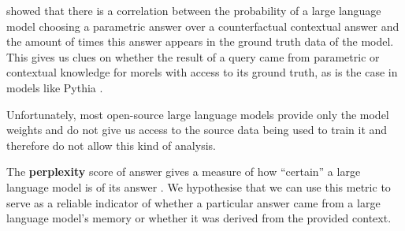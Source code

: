  showed that there is a correlation between the probability of a large language model choosing a parametric answer over a counterfactual contextual answer and the amount of times this answer appears in the ground truth data of the model.
This gives us clues on whether the result of a query came from parametric or contextual knowledge for morels with access to its ground truth, as is the case in models like Pythia \citep{pythia}.

Unfortunately, most open-source large language models provide only the model weights and do not give us access to the source data being used to train it and therefore do not allow this kind of analysis.

The \textbf{perplexity} score of answer gives a measure of how ``certain'' a large language model is of its answer \citep{how_can_we_know}.
We hypothesise that we can use this metric to serve as a reliable indicator of whether a particular answer came from a large language model's memory or whether it was derived from the provided context.
